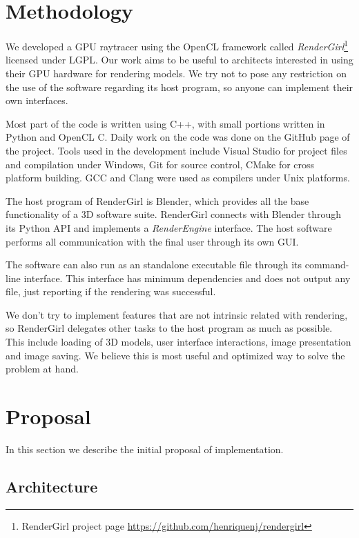 \documentclass[a4paper]{sbgames}               %
\begin{document}
\section{Methodology}
\label{sec:methodology}

We developed a GPU raytracer using the OpenCL framework called
\emph{RenderGirl}\footnote{RenderGirl project page
\url{https://github.com/henriquenj/rendergirl}} licensed under
LGPL. Our work aims to be useful to architects interested in using
their GPU hardware for rendering models. We try not to pose any
restriction on the use of the software regarding its host program, so
anyone can implement their own interfaces.

Most part of the code is written using C++, with small portions
written in Python and OpenCL C. Daily work on the code was done on the
GitHub page of the project. Tools used in the
development include Visual Studio for project files and compilation
under Windows, Git for source control, CMake for cross platform
building. GCC and Clang were used as compilers under Unix platforms.

The host program of RenderGirl is Blender, which provides all the base
functionality of a 3D software suite. RenderGirl connects with Blender
through its Python API and implements a \emph{RenderEngine}
interface. The host software performs all communication with the final
user through its own GUI.

The software can also run as an standalone executable file through its
command-line interface. This interface has minimum dependencies and
does not output any file, just reporting if the rendering was successful.

We don't try to implement features that are not intrinsic related with
rendering, so RenderGirl delegates other tasks to the host program as
much as possible. This include loading of 3D models, user interface
interactions, image presentation and image saving. We believe this is
most useful and optimized way to solve the problem at hand.

\section{Proposal}

In this section we describe the initial proposal of implementation.

\subsection{Architecture}
\end{document}
